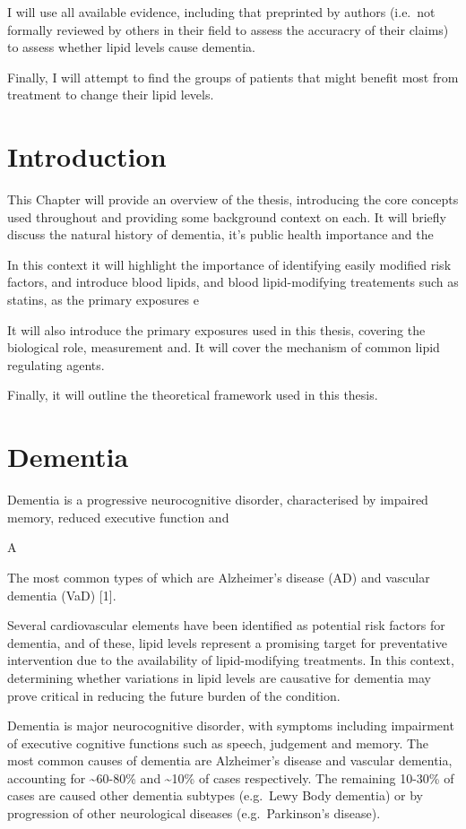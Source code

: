 \documentclass[a4paper,nobind]{templates/ociamthesis}
\begin{document}
I will use all available evidence, including that preprinted by authors (i.e.~not formally reviewed by others in their field to assess the accuracry of their claims) to assess whether lipid levels cause dementia.

Finally, I will attempt to find the groups of patients that might benefit most from treatment to change their lipid levels.

\hypertarget{introduction}{%
\section{Introduction}\label{introduction}}

This Chapter will provide an overview of the thesis, introducing the core concepts used throughout and providing some background context on each. It will briefly discuss the natural history of dementia, it's public health importance and the

In this context it will highlight the importance of identifying easily modified risk factors, and introduce blood lipids, and blood lipid-modifying treatements such as statins, as the primary exposures e

It will also introduce the primary exposures used in this thesis, covering the biological role, measurement and. It will cover the mechanism of common lipid regulating agents.

Finally, it will outline the theoretical framework used in this thesis.

\hypertarget{dementia}{%
\section{Dementia}\label{dementia}}

Dementia is a progressive neurocognitive disorder, characterised by impaired memory, reduced executive function and

A

The most common types of which are Alzheimer's disease (AD) and vascular dementia (VaD) {[}1{]}.

Several cardiovascular elements have been identified as potential risk factors for dementia, and of these, lipid levels represent a promising target for preventative intervention due to the availability of lipid-modifying treatments. In this context, determining whether variations in lipid levels are causative for dementia may prove critical in reducing the future burden of the condition.

Dementia is major neurocognitive disorder, with symptoms including impairment of executive cognitive functions such as speech, judgement and memory. The most common causes of dementia are Alzheimer's disease and vascular dementia, accounting for \textasciitilde60-80\% and \textasciitilde10\% of cases respectively. The remaining 10-30\% of cases are caused other dementia subtypes (e.g.~Lewy Body dementia) or by progression of other neurological diseases (e.g.~Parkinson's disease).
\end{document}
